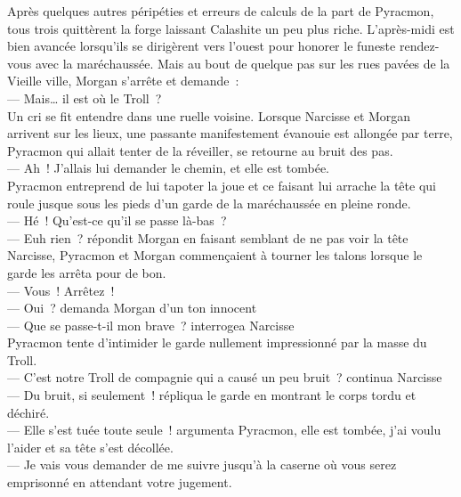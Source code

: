 \documentclass[french, a4paper, 12pt]{article}
\begin{document}
Après quelques autres péripéties et erreurs de calculs de la part de Pyracmon, tous trois quittèrent la forge laissant Calashite un peu plus riche. L'après-midi est bien avancée lorsqu'ils se dirigèrent vers l'ouest pour honorer le funeste rendez-vous avec la maréchaussée. Mais au bout de quelque pas sur les rues pavées de la Vieille ville, Morgan s'arrête et demande~:\\
--- Mais… il est où le Troll~?\\
Un cri se fit entendre dans une ruelle voisine. Lorsque Narcisse et Morgan arrivent sur les lieux, une passante manifestement évanouie est allongée par terre, Pyracmon qui allait tenter de la réveiller, se retourne au bruit des pas.\\
--- Ah~! J'allais lui demander le chemin, et elle est tombée.\\
Pyracmon entreprend de lui tapoter la joue et ce faisant lui arrache la tête qui roule jusque sous les pieds d'un garde de la maréchaussée en pleine ronde.\\
--- Hé~! Qu'est-ce qu'il se passe là-bas~?\\
--- Euh rien~? répondit Morgan en faisant semblant de ne pas voir la tête\\

Narcisse, Pyracmon et Morgan commençaient à tourner les talons lorsque le garde les arrêta pour de bon.\\
--- Vous~! Arrêtez~!\\
--- Oui~? demanda Morgan d'un ton innocent\\
--- Que se passe-t-il mon brave~? interrogea Narcisse\\
Pyracmon tente d'intimider le garde nullement impressionné par la masse du Troll.\\
--- C'est notre Troll de compagnie qui a causé un peu bruit~? continua Narcisse\\
--- Du bruit, si seulement~! répliqua le garde en montrant le corps tordu et déchiré.\\
--- Elle s'est tuée toute seule~! argumenta Pyracmon, elle est tombée, j'ai voulu l'aider et sa tête s'est décollée.\\ 
--- Je vais vous demander de me suivre jusqu'à la caserne où vous serez emprisonné en attendant votre jugement.\\
\end{document}
